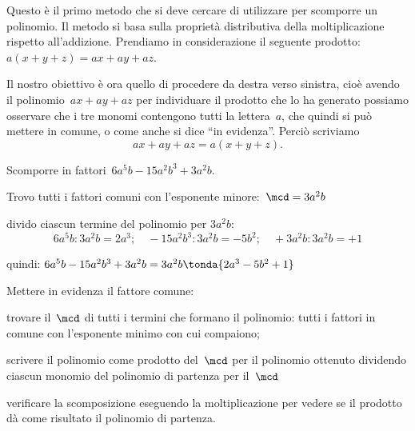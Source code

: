 Questo è il primo metodo che si deve cercare di utilizzare per scomporre un 
polinomio.
Il metodo si basa sulla proprietà distributiva della moltiplicazione rispetto 
all'addizione.
Prendiamo in considerazione il seguente prodotto:~\(a(x+y+z)=ax+ay+az\).

Il nostro obiettivo è ora quello di procedere da destra verso sinistra, 
cioè avendo il polinomio~\(ax+ay+az\) per individuare il 
prodotto che lo ha generato possiamo osservare che i tre monomi contengono 
tutti la lettera~\(a\), che quindi si può mettere in comune,
o come anche si dice ``in evidenza''. Perciò scriviamo 
\[ax+ay+az=a(x+y+z).\]

 \begin{esempio}
Scomporre in fattori~\(6a^{5}b-15a^{2}b^{3}+3a^2b\).
 \begin{enumeratea}
 \item Trovo tutti i fattori comuni con l'esponente 
minore:~\(\mcd=3a^2b\)
 \item divido ciascun termine del polinomio per \(3a^2b\):
\[6a^{5}b : 3a^2b = 2a^{3}; \quad 
  -15a^{2}b^{3} : 3a^2b = -5b^{2}; \quad 
  +3a^2b : 3a^2b = +1\]
 \item quindi:\quad 
\(6a^{5}b-15a^{2}b^{3}+3a^2b=3a^{2}b\tonda{2a^{3}-5b^{2}+1}\)
 \end{enumeratea}
 \end{esempio}

\begin{procedura}
Mettere in evidenza il fattore comune:
\begin{enumeratea}
\item trovare il~\(\mcd\) di tutti i termini che formano il polinomio: tutti i 
 fattori in comune con l'esponente minimo con cui compaiono;
\item scrivere il polinomio come prodotto del~\(\mcd\) per il polinomio 
ottenuto 
 dividendo ciascun monomio del polinomio di partenza per il~\(\mcd\)
\item verificare la scomposizione eseguendo la moltiplicazione per vedere se 
 il prodotto dà come risultato il polinomio di partenza.
\end{enumeratea}
\end{procedura}

